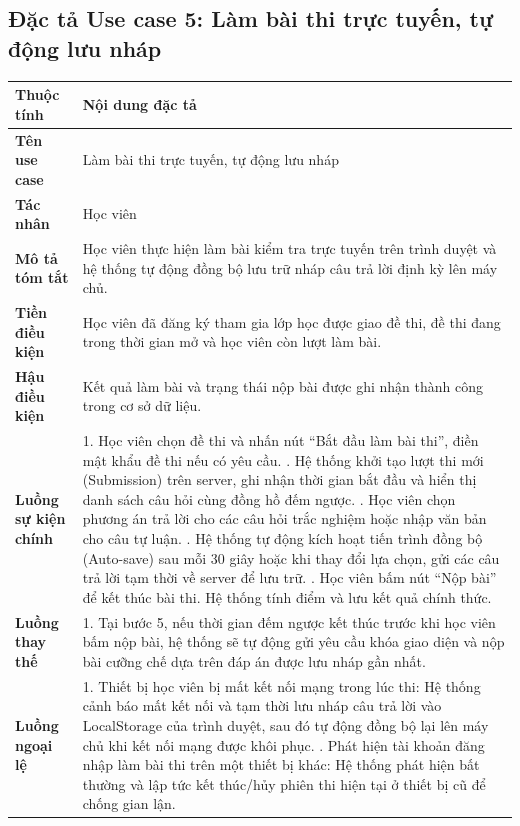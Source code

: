\documentclass[../DoAn.tex]{subfiles}
\begin{document}
\subsection{Đặc tả Use case 5: Làm bài thi trực tuyến, tự động lưu nháp}
\nopagebreak
\begingroup
\centering
\fontsize{11pt}{14pt}\selectfont
\begin{tabular}{|p{3.2cm}|p{10.8cm}|}
\hline
\textbf{Thuộc tính} & \textbf{Nội dung đặc tả} \\ \hline
\textbf{Tên use case} & Làm bài thi trực tuyến, tự động lưu nháp \\ \hline
\textbf{Tác nhân} & Học viên \\ \hline
\textbf{Mô tả tóm tắt} & Học viên thực hiện làm bài kiểm tra trực tuyến trên trình duyệt và hệ thống tự động đồng bộ lưu trữ nháp câu trả lời định kỳ lên máy chủ. \\ \hline
\textbf{Tiền điều kiện} & Học viên đã đăng ký tham gia lớp học được giao đề thi, đề thi đang trong thời gian mở và học viên còn lượt làm bài. \\ \hline
\textbf{Hậu điều kiện} & Kết quả làm bài và trạng thái nộp bài được ghi nhận thành công trong cơ sở dữ liệu. \\ \hline
\textbf{Luồng sự kiện chính} & 
1. Học viên chọn đề thi và nhấn nút ``Bắt đầu làm bài thi'', điền mật khẩu đề thi nếu có yêu cầu. \newline
2. Hệ thống khởi tạo lượt thi mới (Submission) trên server, ghi nhận thời gian bắt đầu và hiển thị danh sách câu hỏi cùng đồng hồ đếm ngược. \newline
3. Học viên chọn phương án trả lời cho các câu hỏi trắc nghiệm hoặc nhập văn bản cho câu tự luận. \newline
4. Hệ thống tự động kích hoạt tiến trình đồng bộ (Auto-save) sau mỗi 30 giây hoặc khi thay đổi lựa chọn, gửi các câu trả lời tạm thời về server để lưu trữ. \newline
5. Học viên bấm nút ``Nộp bài'' để kết thúc bài thi. Hệ thống tính điểm và lưu kết quả chính thức. \\ \hline
\textbf{Luồng thay thế} & 
1. Tại bước 5, nếu thời gian đếm ngược kết thúc trước khi học viên bấm nộp bài, hệ thống sẽ tự động gửi yêu cầu khóa giao diện và nộp bài cưỡng chế dựa trên đáp án được lưu nháp gần nhất. \\ \hline
\textbf{Luồng ngoại lệ} & 
1. Thiết bị học viên bị mất kết nối mạng trong lúc thi: Hệ thống cảnh báo mất kết nối và tạm thời lưu nháp câu trả lời vào LocalStorage của trình duyệt, sau đó tự động đồng bộ lại lên máy chủ khi kết nối mạng được khôi phục. \newline
2. Phát hiện tài khoản đăng nhập làm bài thi trên một thiết bị khác: Hệ thống phát hiện bất thường và lập tức kết thúc/hủy phiên thi hiện tại ở thiết bị cũ để chống gian lận. \\ \hline
\end{tabular}
\label{table:uc_take_exam_autosave}
\par
\endgroup
\end{document}
